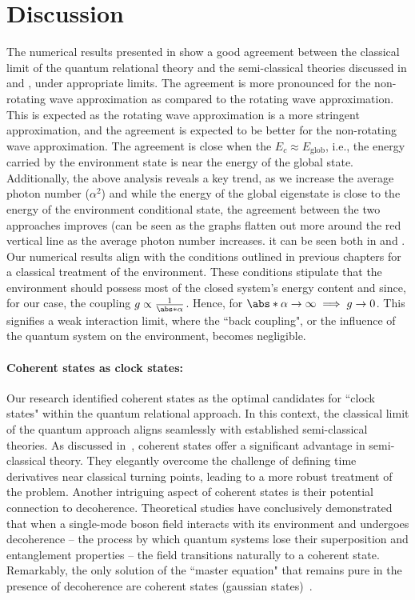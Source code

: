 \newpage 


\section{Discussion}
The numerical results presented in  show a good agreement 
between the classical limit of the quantum relational theory and the semi-classical theories
discussed in  and , under appropriate limits. 
The agreement is more pronounced for the non-rotating wave approximation as compared to the rotating 
wave approximation. This is expected as the rotating wave approximation is a more stringent approximation, and the
agreement is expected to be better for the non-rotating wave approximation.
The agreement is close when the \(E_c \approx E_{\mathrm{glob}}\), 
i.e., the energy carried by the environment state is near the energy of the global state. Additionally,  the above analysis reveals a key trend, as we increase the average photon number (\(\alpha^2\)) and while the energy 
of the global eigenstate
is close to the energy of the environment conditional state, the agreement between the two approaches improves (can be seen as the graphs flatten out more around the red vertical line as the average photon number increases.
it can be seen both in 
 and . 
Our numerical results align with the conditions outlined in previous chapters for a classical treatment of the environment. These conditions stipulate that the environment should possess most of the closed system's energy content and since, for our case, the coupling \(g \propto \frac{1}{\abs*{\alpha}}\). Hence, for \(\abs*{\alpha} \to \infty \implies g \to 0\). This signifies a weak interaction limit, where the ``back coupling", or the influence of the quantum system on the environment, becomes negligible.

\paragraph{Coherent states as clock states:} Our research identified coherent states as the optimal candidates for ``clock states" within the quantum relational approach.  In this context, the classical limit of the quantum approach aligns seamlessly with established semi-classical theories.  As discussed in~\cite{braun2004classical}, coherent states offer a significant advantage in semi-classical theory. They elegantly overcome the challenge of defining time derivatives near classical turning points, leading to a more robust treatment of the problem. 
Another intriguing aspect of coherent states is their potential connection to decoherence. Theoretical studies have conclusively demonstrated that when a single-mode boson field interacts with its environment and undergoes decoherence – the process by which quantum systems lose their superposition and entanglement properties – the field transitions naturally to a coherent state.  Remarkably, the only solution of the ``master equation" that remains pure in the presence of decoherence are coherent states (gaussian states)~\cite{dutra1998decoherence, zuerk_coherent_state_1993}. 


